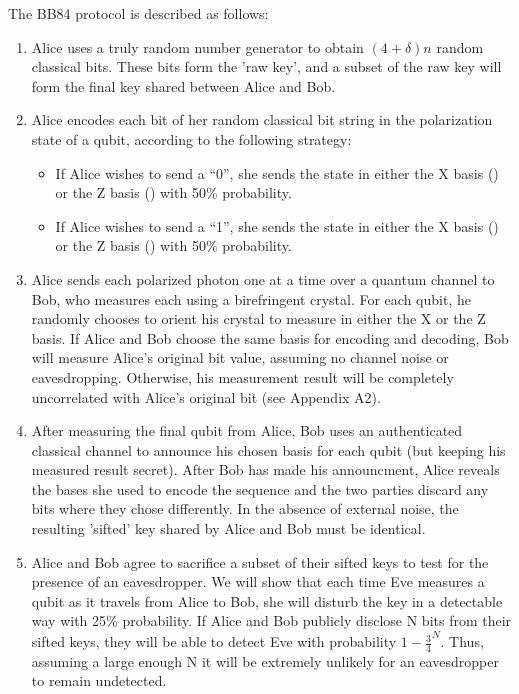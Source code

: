 \documentclass[conference]{IEEEtran}
\begin{document}
The BB84 protocol is described as follows\cite{BB84}:
\begin{enumerate}
\item Alice uses a truly random number generator to obtain $(4 + \delta)n$ random classical bits. These bits form the 'raw key', and a subset of the raw key will form the final key shared between Alice and Bob.
\item Alice encodes each bit of her random classical bit string in the polarization state of a qubit, according to the following strategy:
  \begin{itemize}
  \item If Alice wishes to send a ``0'', she sends the  state in either the X basis (\ket{\uparrow}) or the Z basis (\ket{\nwarrow})  with 50\% probability.
  \item If Alice wishes to send a ``1'', she sends the  state in either the X basis (\ket{\rightarrow}) or the Z basis (\ket{\nearrow}) with 50\% probability.
  \end{itemize}
\item Alice sends each polarized photon one at a time over a quantum channel to Bob, who measures each using a birefringent crystal. For each qubit, he randomly chooses to orient his crystal to measure in either the X or the Z basis. If Alice and Bob choose the same basis for encoding and decoding, Bob will measure Alice's original bit value, assuming no channel noise or eavesdropping. Otherwise, his measurement result will be completely uncorrelated with Alice's original bit (see Appendix A2).
\item After measuring the final qubit from Alice, Bob uses an authenticated classical channel to announce his chosen basis for each qubit (but keeping his measured result secret). After Bob has made his announcment, Alice reveals the bases she used to encode the sequence and the two parties discard any bits where they chose differently. In the absence of external noise, the resulting 'sifted' key shared by Alice and Bob must be identical.
\item Alice and Bob agree to sacrifice a subset of their sifted keys to test for the presence of an eavesdropper. We will show that each time Eve measures a qubit as it travels from Alice to Bob, she will disturb the key in a detectable way with 25\% probability. If Alice and Bob publicly disclose N bits from their sifted keys, they will be able to detect Eve with probability $1 - \frac{3}{4}^N$. Thus, assuming a large enough N it will be extremely unlikely for an eavesdropper to remain undetected.\\
\end{enumerate}
\end{document}
